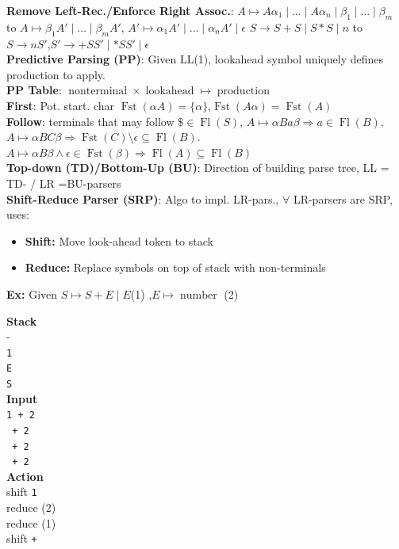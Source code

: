 \textbf{Remove Left-Rec./Enforce Right Assoc.}: $A \mapsto A\alpha_1 \mid \ldots  \mid A \alpha_n \mid \beta_1 \mid \ldots \mid \beta_m$ to $A \mapsto \beta_1 A' \mid \ldots  \mid \beta_m A'$, $A' \mapsto \alpha_1 A' \mid \ldots \mid \alpha_n A' \mid \epsilon$ {\color{Aquamarine}$S \to S+S\mid S*S\mid n$ to $S\to n S'$,$S'\to+SS'\mid *SS'\mid \epsilon$} \\




\textbf{Predictive Parsing (PP)}: Given LL(1), lookahead symbol uniquely defines production to apply.\\
\textbf{PP Table}: $\operatorname{nonterminal}\times \operatorname{lookahead} \mapsto \operatorname{production}$\\
\textbf{First}: Pot. start. char $\operatorname{Fst}(\alpha A)=\{\alpha\}$,$\operatorname{Fst}(A\alpha)=\operatorname{Fst}(A)$\\
\textbf{Follow}: terminals that may follow $\$\in \operatorname{Fl}(S)$, $A\mapsto \alpha B a \beta\Rightarrow a \in \operatorname{Fl}(B)$,$A\mapsto \alpha B C \beta \Rightarrow \operatorname{Fst}(C)\setminus \epsilon \subseteq \operatorname{Fl}(B)$. $A\mapsto \alpha B \beta \wedge \epsilon \in \operatorname{Fst}(\beta) \Rightarrow \operatorname{Fl}(A) \subseteq \operatorname{Fl}(B) $ \\
\textbf{Top-down (TD)/Bottom-Up (BU)}: Direction of building parse tree, LL = TD- / LR =BU-parsers \\
\textbf{Shift-Reduce Parser (SRP)}: Algo to impl. LR-pars., $\forall$ LR-parsers are SRP, uses:
\begin{itemize}[leftmargin = *,noitemsep]
\item \textbf{Shift:} Move look-ahead token to stack
\item \textbf{Reduce:} Replace symbols on top of stack with non-terminals
 \end{itemize}
 \textbf{Ex:} Given $S \mapsto S + E \mid E$(1) ,$E \mapsto \operatorname{number}$ (2)
\begin{multicols}{3}
\textbf{Stack}\\
- \\
\texttt{1} \\
\texttt{E} \\
\texttt{S} \\

\columnbreak
\textbf{Input}\\
\texttt{1 + 2} \\
\texttt{ + 2} \\
\texttt{ + 2} \\
\texttt{ + 2}\\
\columnbreak
\textbf{Action}\\
shift \texttt{1} \\
reduce (2) \\
reduce (1) \\
shift  \texttt{+}


\end{multicols}

